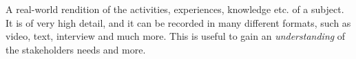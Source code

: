 \begin{tool} \label{tool:user_story} 
  A real-world rendition of the activities, experiences, knowledge etc. of a subject. It is of very high detail, and it can be recorded in many different formats, such as video, text, interview and much more. This is useful to gain an \emph{understanding} of the stakeholders needs and more. \cite[p. 62-63]{benyon14}
\end{tool}
